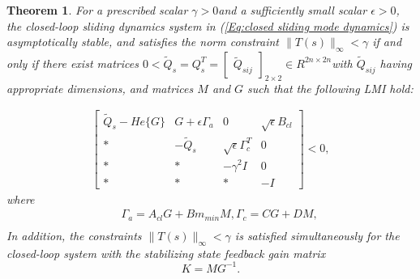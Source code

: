 \documentclass[journal,onecolumn]{IEEEtran}
\newtheorem{Thm}{Theorem}
\begin{document}
 \begin{Thm}\label{thm2}  For a prescribed scalar $\gamma>0$and a sufficiently small scalar $\epsilon>0$, the
 closed-loop sliding dynamics
 system in
(\ref{Eq:closed sliding mode dynamics}) is asymptotically stable,
and satisfies the norm constraint $\|T(s)\|_{\infty}<\gamma$ if and
only if
 there exist matrices $0<\tilde{Q}_s=Q_s^T=\left[\begin{array}{cc}\tilde{Q}_{sij}\end{array}\right]_{2\times2}\in
R^{2n\times 2n}$with $\tilde{Q}_{sij}$ having appropriate
dimensions,  and matrices $M$ and $G$ such that the following LMI
hold:

\begin{equation}\begin{array}{l}
\label{Eq:Thm 2 stand} \left[\begin{array}{ccccc}
\tilde{Q}_s-He\{G\}&G+\epsilon \Gamma_a &0&\sqrt{\epsilon}B_{cl}\\ *&-\tilde{Q}_s&\sqrt{\epsilon}\Gamma_c^T&0\\

*&*&-\gamma^2 I&0
\\
*&*&*& - I
\end{array}\right]<0,\end{array}
\end{equation}
where
\begin{eqnarray*}
&&\Gamma_a=A_{cl}G+Bm_{min}M, \Gamma_c=CG+DM,\\&&
\end{eqnarray*}
In addition, the constraints $\|T(s)\|_{\infty}<\gamma$ is satisfied
simultaneously for the closed-loop system with the stabilizing state
feedback gain matrix
\begin{equation}
\label{Eq:State Controller Para} K=MG^{-1}.
\end{equation}
\end{Thm}
\end{document}
